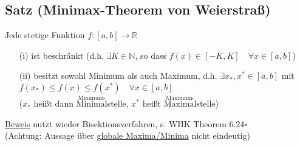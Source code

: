 \documentclass[12pt, titlepage]{article}
\newcommand{\R}{\mathds{R}}
\newcommand{\N}{\mathds{N}}
\renewcommand{\>}{\rightarrow}
\renewcommand{\*}{\cdot}
\begin{document}
	\subsection{Satz (Minimax-Theorem von Weierstraß)}
	Jede stetige Funktion $f\colon[a,b]\>\R$
	\begin{itemize}
		\item[(i)] ist beschränkt (d.h. $\exists K\in\N$, so dass $f(x)\in[-K,K]\quad\forall x\in[a,b]$)
		\item[(ii)] besitzt sowohl Minimum als auch Maximum, d.h. $\exists x_*,x^*\in[a,b]$ mit\\
		 $f(x_*)\leq f(x)\leq f(x^*)\quad\forall x\in[a,b]$\\
		($x_*$ heißt dann $\overset{\textrm{Minimum-}}{\textrm{Minimal}}$stelle, $x^*$ heißt $\overset{\textrm{Maximum-}}{\textrm{Maximal}}$stelle)
	\end{itemize}
	\underline{Beweis} nutzt wieder Bisektionsverfahren, s. WHK Theorem 6.24\hfill$\square$\\
	(Achtung: Aussage über \underline{globale Maxima/Minima} nicht eindeutig)
\end{document}
